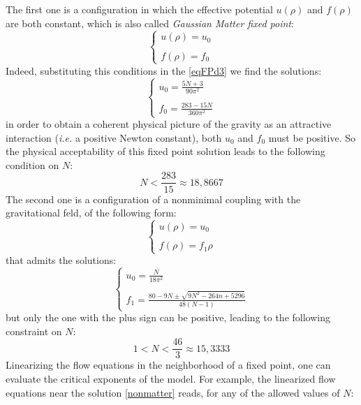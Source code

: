 The first one is a configuration in which the effective potential $u(\rho)$ and $f(\rho)$ are both constant, which is also called \emph{Gaussian Matter fixed point}\cite{vacca24}:
\begin{equation}
\left\{
\begin{array}{l}
u (\rho) = u_0\\ \ \\
f (\rho) = f_0
\end{array}
\right.
\end{equation}
Indeed, substituting this conditions in the \eqref{eqFPd3} we find the solutions:
\begin{equation}
\left\{
\begin{array}{l}
u_0 = \frac{5 N+3}{90 \pi ^2}\\ \ \\
f_0 = \frac{283-15 N}{360 \pi ^2}
\end{array}
\right.
\end{equation}
in order to obtain a coherent physical picture of the gravity as an attractive interaction (\emph{i.e.} a positive Newton constant), both $u_0$ and $f_0$ must be positive. 
So the physical acceptability of this fixed point solution leads to the following condition on $N$:
\begin{equation}
 N <\frac{283}{15} \approx 18,8667
\end{equation}
The second one is a configuration of a nonminimal coupling with the gravitational feld, of the following form:
\begin{equation}
\left\{
\begin{array}{l}
u (\rho) = u_0\\ \ \\
f(\rho) =  f_1\rho
\end{array}
\right.
\end{equation}
that admits the solutions:
\begin{equation}\label{nonmatter}
\left\{
\begin{array}{l}
u_0 = 	\frac{N}{18 \pi ^2}		\\ \ \\
f_1 = \frac{80 - 9N \pm \sqrt{9 N^2-264 n+5296}}{48 (N-1)}
\end{array}
\right.
\end{equation}
but only the one with the plus sign can be positive, leading to the following constraint on $N$:
\begin{equation}
 1 < N < \frac{46}{3} \approx 15,3333
\end{equation}
Linearizing the flow equations in the neighborhood of a fixed point, one can evaluate the critical
exponents of the model. For example, the linearized flow equations  near the solution \eqref{nonmatter} reads, for any of the
allowed values of $N$:

